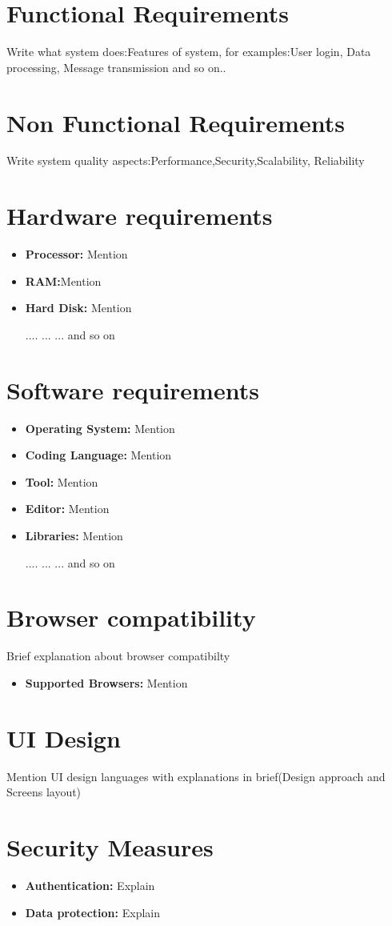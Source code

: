\section{Functional Requirements}
    Write what system does:Features of system, for examples:User login, Data processing, Message transmission and so on..

\section{Non Functional Requirements}
    Write system quality aspects:Performance,Security,Scalability, Reliability
\section{Hardware requirements}
\begin{itemize}
\item \textbf{Processor:} Mention
\item \textbf{RAM:}Mention
\item \textbf{Hard Disk:} Mention

....
...
...
and so on
\end{itemize}

\section{Software requirements}
\begin{itemize}
\item \textbf{Operating System:} Mention
\item \textbf{Coding Language:} Mention
\item \textbf{Tool:} Mention
\item \textbf{Editor:} Mention
\item \textbf{Libraries:} Mention

....
...
...
and so on
\end{itemize}
\section{Browser compatibility}
Brief explanation about browser compatibilty
    \begin{itemize}
        \item{\textbf{Supported Browsers: }}Mention
    \end{itemize}
\section{UI Design}Mention UI design languages with explanations in brief(Design approach and Screens layout)
\section{Security Measures}
    \begin{itemize}
        \item{\textbf{Authentication: }}Explain
        \item{\textbf{Data protection: }}Explain
    \end{itemize}
   
